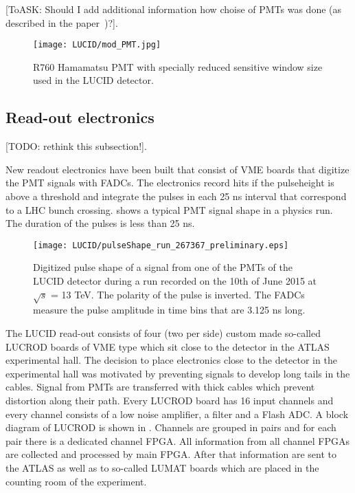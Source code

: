 [ToASK: Should I add additional information how choise of PMTs was done (as described in the paper~\cite{Alberghi:2016tad})?].

\begin{figure}
\centering
\texttt{[image: LUCID/mod\_PMT.jpg]}
\caption{R760 Hamamatsu PMT with specially reduced sensitive window size used in the LUCID detector.}
\label{fig:modPMT}
\end{figure}


\subsection{Read-out electronics}
\label{subsec:LUCIDElectronics}

[TODO: rethink this subsection!].

New readout electronics have been built that consist of VME boards that digitize the PMT signals with FADCs. 
The electronics record hits if the pulseheight is above a threshold and integrate the pulses in each 25 ns 
interval that correspond to a LHC bunch crossing.  shows a typical PMT signal shape in 
a physics run. The duration of the pulses is less than 25 ns.

\begin{figure}
\centering
\texttt{[image: LUCID/pulseShape\_run\_267367\_preliminary.eps]}
\caption{Digitized pulse shape of a signal from one of the PMTs of the LUCID detector during a run recorded on 
the 10th of June 2015 at $\sqrt{s}$ = 13 TeV. The polarity of the pulse is inverted. The FADCs measure the 
pulse amplitude in time bins that are 3.125 ns long.}
\label{fig:pulseShape}
\end{figure}

The LUCID read-out consists of four (two per side) custom made so-called LUCROD boards of VME type which sit close to the detector in the ATLAS experimental hall.
The decision to place electronics close to the detector in the experimental hall was motivated by preventing signals to develop long tails in the cables.
Signal from PMTs are transferred with thick cables which prevent distortion along their path.
Every LUCROD board has 16 input channels and every channel consists of a low noise amplifier, a filter and a Flash ADC.
A block diagram of LUCROD is shown in .
Channels are grouped in pairs and for each pair there is a dedicated channel FPGA.
All information from all channel FPGAs are collected and processed by main FPGA.
After that information are sent to the ATLAS as well as to so-called LUMAT boards which are placed in the counting room of the experiment.

